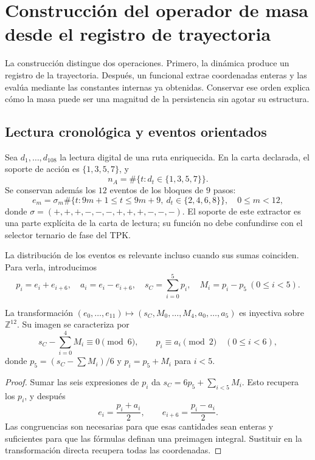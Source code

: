 \section{Construcción del operador de masa desde el registro de trayectoria}
\label{vi:vi:sec:operador-masa}

La construcción distingue dos operaciones. Primero, la dinámica produce
un registro de la trayectoria. Después, un funcional extrae coordenadas
enteras y las evalúa mediante las constantes internas ya obtenidas.
Conservar ese orden explica cómo la masa puede ser una magnitud de la
persistencia sin agotar su estructura.

\subsection{Lectura cronológica y eventos orientados}

Sea \(d_1,\ldots,d_{108}\) la lectura digital de una ruta enriquecida.
En la carta declarada, el soporte de acción es \(\{1,3,5,7\}\), y
\[
 n_A=\#\{t:d_t\in\{1,3,5,7\}\}.
\]
Se conservan además los \(12\) eventos de los bloques de \(9\) pasos:
\[
 e_m=\sigma_m\#\{t:9m+1\le t\le9m+9,\ d_t\in\{2,4,6,8\}\},
 \quad 0\le m<12,
\]
donde \(\sigma=(+,+,+,-,-,-,+,+,+,-,-,-)\). El soporte de este
extractor es una parte explícita de la carta de lectura; su función no
debe confundirse con el selector ternario de fase del TPK.

La distribución de los eventos es relevante incluso cuando sus sumas
coinciden. Para verla, introducimos
\[
 p_i=e_i+e_{i+6},\quad a_i=e_i-e_{i+6},\quad
 s_C=\sum_{i=0}^{5}p_i,\quad M_i=p_i-p_5\ (0\le i<5).
\]

\begin{proposition}
\label{vi:vi:prop:eventos}
La transformación \((e_0,\ldots,e_{11})\mapsto(s_C,M_0,\ldots,M_4,a_0,\ldots,a_5)\)
es inyectiva sobre \(\mathbb Z^{12}\). Su imagen se caracteriza por
\[
 s_C-\sum_{i=0}^4M_i\equiv0\pmod6,
 \qquad p_i\equiv a_i\pmod2\quad(0\le i<6),
\]
donde \(p_5=(s_C-\sum M_i)/6\) y \(p_i=p_5+M_i\) para \(i<5\).
\end{proposition}
\begin{proof}
Sumar las seis expresiones de \(p_i\) da
\(s_C=6p_5+\sum_{i<5}M_i\). Esto recupera los \(p_i\), y después
\[
 e_i=\frac{p_i+a_i}{2},\qquad
 e_{i+6}=\frac{p_i-a_i}{2}.
\]
Las congruencias son necesarias para que esas cantidades sean enteras y
suficientes para que las fórmulas definan una preimagen integral. Sustituir
en la transformación directa recupera todas las coordenadas.
\end{proof}

